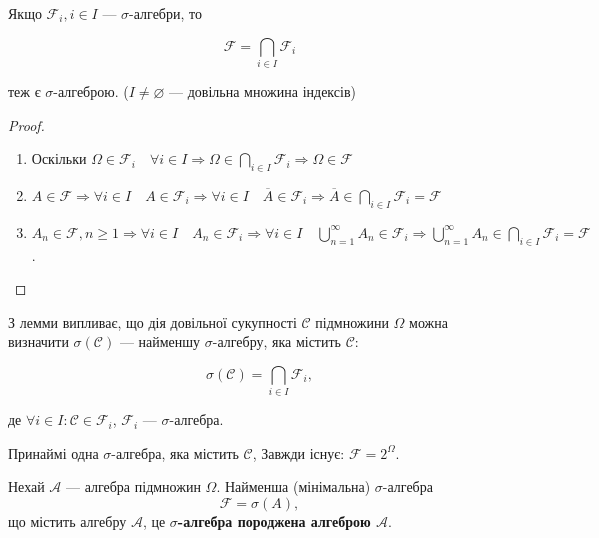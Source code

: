 \begin{lemma}
    Якщо $\mathcal{F}_i, i \in I$ --- $\sigma$-алгебри, то

    $$\mathcal{F} = \bigcap\limits_{i \in I} \mathcal{F}_i$$
    
    теж є $\sigma$-алгеброю. ($I \neq \varnothing$ --- довільна множина індексів)
\end{lemma}
\begin{proof}
    \begin{enumerate}
        \item Оскільки $\Omega \in \mathcal{F}_i \quad \forall i \in I \Rightarrow 
        \Omega \in \bigcap\limits_{i \in I} \mathcal{F}_i \Rightarrow 
        \Omega \in \mathcal{F}$

        \item $A \in \mathcal{F} \Rightarrow 
        \forall i \in I \quad A \in \mathcal{F}_i \Rightarrow 
        \forall i \in I \quad \overline{A} \in \mathcal{F}_i \Rightarrow 
        \overline{A} \in \bigcap\limits_{i \in I} \mathcal{F}_i = \mathcal{F}$

        \item $A_n \in \mathcal{F}, n \geqslant 1 \Rightarrow 
        \forall i \in I \quad A_n \in \mathcal{F}_i \Rightarrow 
        \forall i \in I \quad \bigcup\limits_{n = 1}^{\infty} A_n \in \mathcal{F}_i \Rightarrow 
        \bigcup\limits_{n = 1}^{\infty} A_n \in \bigcap\limits_{i \in I} \mathcal{F}_i = \mathcal{F}$.
    \end{enumerate}
\end{proof}

З лемми випливає, що дія довільної сукупності $\mathcal{C}$
підмножини $\Omega$ можна визначити $\sigma(\mathcal{C})$
--- найменшу $\sigma$-алгебру, яка містить $\mathcal{C}$:

$$\sigma(\mathcal{C}) = \bigcap\limits_{i \in I} \mathcal{F}_i,$$

де $\forall i \in I: \mathcal{C} \in \mathcal{F}_i$,
$\mathcal{F}_i$ --- $\sigma$-алгебра.

\begin{remark}
    Принаймі одна  $\sigma$-алгебра, яка містить $\mathcal{C}$,
    Завжди існує: $\mathcal{F} = 2^{\Omega}$.
\end{remark}

\begin{definition}
    Нехай $\mathcal{A}$ --- алгебра підмножин $\Omega$. Найменша
    (мінімальна) $\sigma$-алгебра
    $$\mathcal{F} = \sigma(A),$$
    що містить алгебру $\mathcal{A}$, це \textbf{$\sigma$-алгебра
    породжена алгеброю $\mathcal{A}$}.    
\end{definition}

